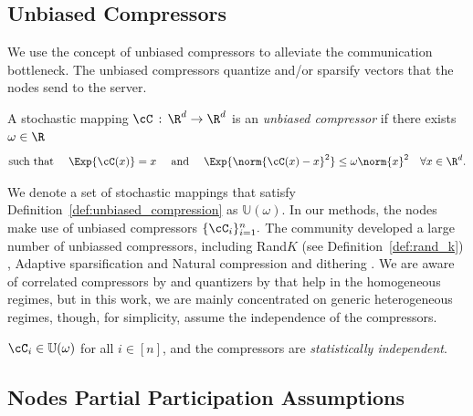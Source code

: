 \documentclass{article}
\begin{document}
\subsection{Unbiased Compressors}
We use the concept of unbiased compressors to alleviate the communication bottleneck. The unbiased compressors quantize and/or sparsify vectors that the nodes send to the server.
\begin{definition}
    \label{def:unbiased_compression}
    A stochastic mapping $\cC\,:\,\R^d \rightarrow \R^d$ is an \textit{unbiased compressor} if
    there exists $\omega \in \R$
    \begin{align}
        \label{eq:compressor}
        \textnormal{such that }\quad \Exp{\cC(x)} = x \quad \textnormal{ and } \quad \Exp{\norm{\cC(x) - x}^2} \leq \omega \norm{x}^2 \quad \forall x \in \R^d.
    \end{align}
\end{definition}
We denote a set of stochastic mappings that satisfy Definition~\ref{def:unbiased_compression} as $\mathbb{U}(\omega).$
In our methods, the nodes make use of unbiased compressors $\{\cC_i\}_{i=1}^n.$ 
The community developed a large number of unbiassed compressors, including Rand$K$ (see Definition~\ref{def:rand_k}) \citep{beznosikov2020biased, stich2018sparsified}, Adaptive sparsification \citep{wangni2018gradient} and Natural compression and dithering \citep{horvath2019natural}. We are aware of correlated compressors by \cite{szlendak2021permutation} and quantizers by \cite{suresh2022correlated} that help in the homogeneous regimes, but in this work, we are mainly concentrated on generic heterogeneous regimes, though, for simplicity, assume the independence of the compressors.
\begin{assumption}
\label{ass:compressors}
 $\cC_i \in \mathbb{U}(\omega)$ for all $i\in [n]$, and the compressors are \textit{statistically independent}.
\end{assumption}

\subsection{Nodes Partial Participation Assumptions}
\label{sec:partial_participation}

\newcommand\Item[1][]{%
  \ifx\relax#1\relax  \item \else \item[#1] \fi
  \abovedisplayskip=0pt\abovedisplayshortskip=0pt~\vspace*{-\baselineskip}}
\end{document}
